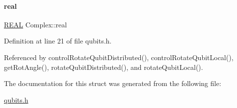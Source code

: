 \mbox{\label{structComplex_a479ad939835457595fcca3ca55c06283}} 
\paragraph{\texorpdfstring{real}{real}}
{\footnotesize\ttfamily \hyperlink{precision_8h_a4b654506f18b8bfd61ad2a29a7e38c25}{R\+E\+AL} Complex\+::real}



Definition at line 21 of file qubits.\+h.



Referenced by control\+Rotate\+Qubit\+Distributed(), control\+Rotate\+Qubit\+Local(), get\+Rot\+Angle(), rotate\+Qubit\+Distributed(), and rotate\+Qubit\+Local().



The documentation for this struct was generated from the following file\+:\begin{DoxyCompactItemize}
\item 
\hyperlink{qubits_8h}{qubits.\+h}\end{DoxyCompactItemize}
